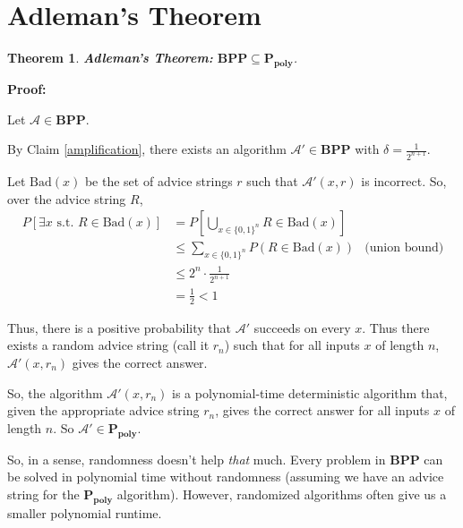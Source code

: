 \documentclass[11pt]{article}
\newcommand{\BPP}{\ensuremath{\mathbf{BPP}}}
\newcommand{\Ppoly}{\ensuremath{\mathbf{P_{poly}}}}
\newcommand{\Alg}{\ensuremath{\mathcal{A}}}
\newtheorem{theorem}{Theorem}
\begin{document}
\section{Adleman's Theorem}

\begin{theorem}
\textbf{Adleman's Theorem:} $\BPP\subseteq\Ppoly$.
\end{theorem}

\begin{leftbar}

\textbf{Proof:}

Let $\Alg\in\BPP$.

By Claim \ref{amplification}, there exists an algorithm $\Alg' \in \BPP$ with $\delta = \frac{1}{2^{n+1}}$.

Let $\mathrm{Bad}(x)$ be the set of advice strings $r$ such that $\Alg'(x,r)$ is incorrect.
So, over the advice string $R$,
\begin{align*}
  P[\exists x \text{ s.t. $R \in \mathrm{Bad}(x)$}]
  &= P\left[\bigcup_{x \in \{0,1\}^n} R \in \mathrm{Bad}(x) \right] \\
  &\le \sum_{x \in \{0,1\}^n} P(R \in \mathrm{Bad}(x)) &\text{(union bound)}\\
  &\le 2^n \cdot \frac{1}{2^{n+1}} \\
  &= \frac12 < 1
\end{align*}

Thus, there is a positive probability that $\Alg'$ succeeds on every $x$. Thus there exists a random advice string (call it $r_n$) such that for all inputs $x$ of length $n$, $\Alg'(x, r_n)$ gives the correct answer.

So, the algorithm $\Alg'(x, r_n)$ is a polynomial-time deterministic algorithm that, given the appropriate advice string $r_n$, gives the correct answer for all inputs $x$ of length $n$. So $\Alg' \in \Ppoly$.
\end{leftbar}

So, in a sense, randomness doesn't help \textit{that} much. Every problem in $\BPP$ can be solved in polynomial time without randomness (assuming we have an advice string for the $\Ppoly$ algorithm). However, randomized algorithms often give us a smaller polynomial runtime.


\end{document}
